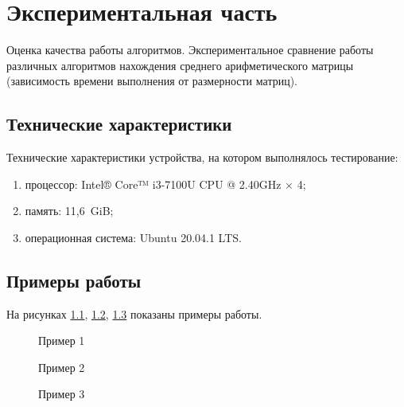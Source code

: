 


\chapter{Экспериментальная часть}\label{exp}

Оценка качества работы алгоритмов. Экспериментальное сравнение работы различных алгоритмов нахождения среднего арифметического матрицы
(зависимость времени выполнения от размерности матриц).

\section{Технические характеристики}\label{texcharacters}

Технические характеристики устройства, на котором выполнялось тестирование:

\begin{enumerate}
    \item процессор: Intel® Core™ i3-7100U CPU @ 2.40GHz × 4; 
    \item память: 11,6 GiB;
    \item операционная система: Ubuntu 20.04.1 LTS.
\end{enumerate}

\section{Примеры работы}\label{examples}

На рисунках \ref{ris:w1}, \ref{ris:w2}, \ref{ris:w3} показаны примеры работы.

\begin{figure}[H]
    \center{\texttt{[image: w2]}}
    \caption{Пример 1}
    \label{ris:w1}
\end{figure}
  
\begin{figure}[H]
    \center{\texttt{[image: w3]}}
    \caption{Пример 2}
    \label{ris:w2}
\end{figure}
  
  
\begin{figure}[H]
    \center{\texttt{[image: w1]}}
    \caption{Пример 3}
    \label{ris:w3}
\end{figure}

